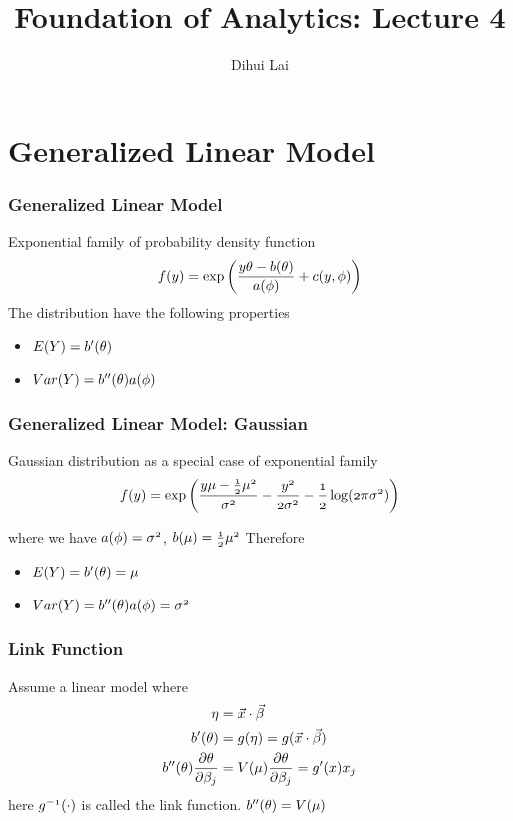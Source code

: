 \documentclass[notheorems, aspectratio=54]{beamer}
\title{Foundation of Analytics: Lecture 4}
\author{Dihui Lai}
\institute[WUSTL]{dlai@wustl.edu}
\begin{document}
\begin{frame}
    \titlepage
\end{frame}



\section{Generalized Linear Model}

\begin{frame}
\frametitle{Generalized Linear Model}
Exponential family of probability density function
$$
\mathnormal{f(y)}=\exp\mathnormal{\left( \frac{y\theta-b(\theta)}{a(\phi)}+c(y, \phi)\right)}
$$
The distribution have the following properties
\begin{itemize}
\item $\mathnormal{E(Y)}=\mathnormal{b'(\theta)}$
\item $\mathnormal{Var(Y)}=\mathnormal{b''(\theta)a(\phi)}$
\end{itemize}
\end{frame}

\begin{frame}

\frametitle{Generalized Linear Model: Gaussian}
Gaussian distribution as a special case of exponential family 
$$
\mathnormal{f(y)}=\exp\mathnormal{\left( \frac{y\mu-\frac{1}{2}\mu^2}{\sigma^2}-\frac{y^2}{2\sigma^2}-\frac{1}{2}\log(2\pi\sigma^2)\right)}
$$

where we have $\mathnormal{a(\phi)=\sigma^2}$, $\mathnormal{b(\mu)=\frac{1}{2}\mu^2}$
Therefore
\begin{itemize}
\item $\mathnormal{E(Y)}=\mathnormal{b'(\theta)=\mu}$
\item $\mathnormal{Var(Y)}=\mathnormal{b''(\theta)a(\phi)=\sigma^2}$
\end{itemize}
\end{frame}

\begin{frame}
\frametitle{Link Function}
Assume a linear model where 
\begin{align*}
\mathnormal{\eta}&=\mathnormal{\vec{x}\cdot\vec{\beta}}\\
\mathnormal{b'(\theta)}&=\mathnormal{g(\eta)}=\mathnormal{g(\vec{x}\cdot\vec{\beta})}\\ 
\mathnormal{b''(\theta)}\frac{\partial \theta}{\partial \beta_j}&=\mathnormal{V(\mu)}\frac{\partial \theta}{\partial \beta_j}=\mathnormal{g'(x)x_j}
\end{align*}
here $\mathnormal{g^{-1}(\cdot)}$ is called the link function. $\mathnormal{b''(\theta)=V(\mu)}$

\end{frame}
\end{document}
